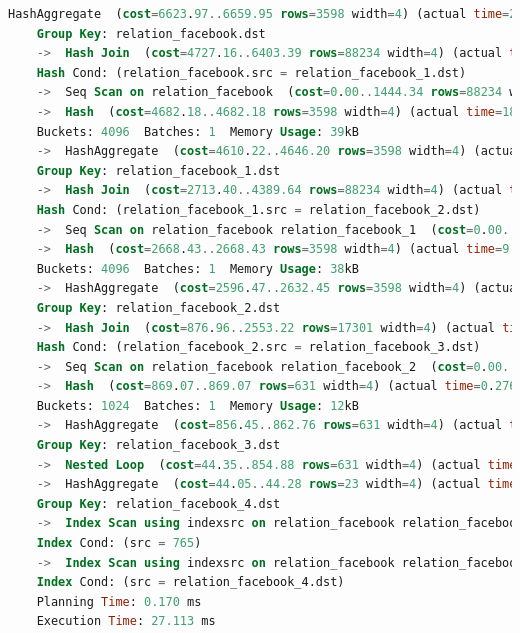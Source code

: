 \begin{lstlisting}[language=SQL,caption = Ausführungsplan verschachteltes SELECT,frame=single, label={2.AusführungsplanCascadeSELECT.listing} ]
    HashAggregate  (cost=6623.97..6659.95 rows=3598 width=4) (actual time=27.019..27.049 rows=317 loops=1)
    Group Key: relation_facebook.dst
    ->  Hash Join  (cost=4727.16..6403.39 rows=88234 width=4) (actual time=20.593..26.743 rows=2411 loops=1)
    Hash Cond: (relation_facebook.src = relation_facebook_1.dst)
    ->  Seq Scan on relation_facebook  (cost=0.00..1444.34 rows=88234 width=8) (actual time=0.008..3.889 rows=88234 loops=1)
    ->  Hash  (cost=4682.18..4682.18 rows=3598 width=4) (actual time=18.021..18.021 rows=195 loops=1)
    Buckets: 4096  Batches: 1  Memory Usage: 39kB
    ->  HashAggregate  (cost=4610.22..4646.20 rows=3598 width=4) (actual time=17.976..18.000 rows=195 loops=1)
    Group Key: relation_facebook_1.dst
    ->  Hash Join  (cost=2713.40..4389.64 rows=88234 width=4) (actual time=11.821..17.797 rows=1709 loops=1)
    Hash Cond: (relation_facebook_1.src = relation_facebook_2.dst)
    ->  Seq Scan on relation_facebook relation_facebook_1  (cost=0.00..1444.34 rows=88234 width=8) (actual time=0.002..3.916 rows=88234 loops=1)
    ->  Hash  (cost=2668.43..2668.43 rows=3598 width=4) (actual time=9.177..9.177 rows=144 loops=1)
    Buckets: 4096  Batches: 1  Memory Usage: 38kB
    ->  HashAggregate  (cost=2596.47..2632.45 rows=3598 width=4) (actual time=9.140..9.161 rows=144 loops=1)
    Group Key: relation_facebook_2.dst
    ->  Hash Join  (cost=876.96..2553.22 rows=17301 width=4) (actual time=2.942..9.020 rows=1280 loops=1)
    Hash Cond: (relation_facebook_2.src = relation_facebook_3.dst)
    ->  Seq Scan on relation_facebook relation_facebook_2  (cost=0.00..1444.34 rows=88234 width=8) (actual time=0.002..4.163 rows=88234 loops=1)
    ->  Hash  (cost=869.07..869.07 rows=631 width=4) (actual time=0.276..0.276 rows=88 loops=1)
    Buckets: 1024  Batches: 1  Memory Usage: 12kB
    ->  HashAggregate  (cost=856.45..862.76 rows=631 width=4) (actual time=0.259..0.268 rows=88 loops=1)
    Group Key: relation_facebook_3.dst
    ->  Nested Loop  (cost=44.35..854.88 rows=631 width=4) (actual time=0.022..0.199 rows=629 loops=1)
    ->  HashAggregate  (cost=44.05..44.28 rows=23 width=4) (actual time=0.018..0.021 rows=27 loops=1)
    Group Key: relation_facebook_4.dst
    ->  Index Scan using indexsrc on relation_facebook relation_facebook_4  (cost=0.29..44.00 rows=23 width=4) (actual time=0.009..0.012 rows=27 loops=1)
    Index Cond: (src = 765)
    ->  Index Scan using indexsrc on relation_facebook relation_facebook_3  (cost=0.29..34.96 rows=27 width=8) (actual time=0.002..0.005 rows=23 loops=27)
    Index Cond: (src = relation_facebook_4.dst)
    Planning Time: 0.170 ms
    Execution Time: 27.113 ms


\end{lstlisting}

